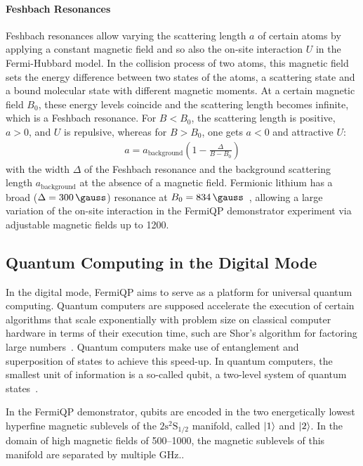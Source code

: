 \paragraph*{Feshbach Resonances} Feshbach resonances allow varying the scattering length $a$ of certain atoms by applying a constant magnetic field and so also the on-site interaction $U$ in the Fermi-Hubbard model. In the collision process of two atoms, this magnetic field sets the energy difference between two states of the atoms, a scattering state and a bound molecular state with different magnetic moments. At a certain magnetic field $B_0$, these energy levels coincide and the scattering length becomes infinite, which is a Feshbach resonance. For $B < B_0$, the scattering length is positive, $a > 0$, and $U$ is repulsive, whereas for $B > B_0$, one gets $a < 0$ and attractive $U$:
\begin{align}
    a = a_\text{background} \left(1 - \frac{\Delta}{B-B_0}\right)
\end{align}
with the width $\Delta$ of the Feshbach resonance and the background scattering length $a_\text{background}$ at the absence of a magnetic field. Fermionic lithium has a broad ($\Delta = \SI[]{300}{\gauss}$) resonance at $B_0 = \SI[]{834}{\gauss}$~\cite{chin_feshbach_2010}, allowing a large variation of the on-site interaction in the FermiQP demonstrator experiment via adjustable magnetic fields up to \SI[]{1200}{\gauss}.

\subsection*{Quantum Computing in the Digital Mode}
In the digital mode, FermiQP aims to serve as a platform for universal quantum computing. Quantum computers are supposed accelerate the execution of certain algorithms that scale exponentially with problem size on classical computer hardware in terms of their execution time, such are Shor's algorithm for factoring large numbers~\cite{shor_algorithms_1994}. Quantum computers make use of entanglement and superposition of states to achieve this speed-up. In quantum computers, the smallest unit of information is a so-called qubit, a two-level system of quantum states~\cite{hidary_quantum_2021, mainzer_quantencomputer_2020}.

In the FermiQP demonstrator, qubits are encoded in the two energetically lowest hyperfine magnetic sublevels of the $2\text{s}^2\text{S}_{1/2}$ manifold, called $\Ket{1}$ and $\Ket{2}$. In the domain of high magnetic fields of \SIrange[]{500}{1000}{\gauss}, the magnetic sublevels of this manifold are separated by multiple \si[]{\giga\hertz}.\cite{gehm_properties_2003,wei_magnetic-field_2013}.

